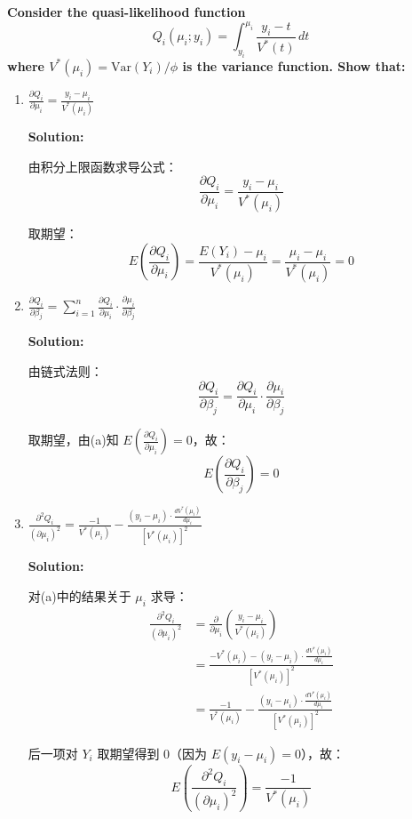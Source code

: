 \textbf{Consider the quasi-likelihood function}
\[
Q_i(\mu_i; y_i) = \int_{y_i}^{\mu_i} \frac{y_i - t}{V^*(t)} \, dt
\]
\textbf{where $V^*(\mu_i) = \text{Var}(Y_i) / \phi$ is the variance function. Show that:}

\begin{enumerate}
\item[(a)] $\frac{\partial Q_i}{\partial \mu_i} = \frac{y_i - \mu_i}{V^*(\mu_i)}$

\textbf{Solution:}

由积分上限函数求导公式：
\[
\frac{\partial Q_i}{\partial \mu_i} = \frac{y_i - \mu_i}{V^*(\mu_i)}
\]

取期望：
\[
E\left(\frac{\partial Q_i}{\partial \mu_i}\right) = \frac{E(Y_i) - \mu_i}{V^*(\mu_i)} = \frac{\mu_i - \mu_i}{V^*(\mu_i)} = 0
\]

\bigskip

\item[(b)] $\frac{\partial Q_i}{\partial \beta_j} = \sum_{i=1}^{n} \frac{\partial Q_i}{\partial \mu_i} \cdot \frac{\partial \mu_i}{\partial \beta_j}$

\textbf{Solution:}

由链式法则：
\[
\frac{\partial Q_i}{\partial \beta_j} = \frac{\partial Q_i}{\partial \mu_i} \cdot \frac{\partial \mu_i}{\partial \beta_j}
\]

取期望，由(a)知 $E\left(\frac{\partial Q_i}{\partial \mu_i}\right) = 0$，故：
\[
E\left(\frac{\partial Q_i}{\partial \beta_j}\right) = 0
\]

\bigskip

\item[(c)] $\frac{\partial^2 Q_i}{(\partial \mu_i)^2} = \frac{-1}{V^*(\mu_i)} - \frac{(y_i - \mu_i) \cdot \frac{dV^*(\mu_i)}{d\mu_i}}{[V^*(\mu_i)]^2}$

\textbf{Solution:}

对(a)中的结果关于 $\mu_i$ 求导：
\begin{align*}
\frac{\partial^2 Q_i}{(\partial \mu_i)^2} &= \frac{\partial}{\partial \mu_i}\left(\frac{y_i - \mu_i}{V^*(\mu_i)}\right) \\
&= \frac{-V^*(\mu_i) - (y_i - \mu_i) \cdot \frac{dV^*(\mu_i)}{d\mu_i}}{[V^*(\mu_i)]^2} \\
&= \frac{-1}{V^*(\mu_i)} - \frac{(y_i - \mu_i) \cdot \frac{dV^*(\mu_i)}{d\mu_i}}{[V^*(\mu_i)]^2}
\end{align*}

后一项对 $Y_i$ 取期望得到 0（因为 $E(y_i - \mu_i) = 0$），故：
\[
E\left(\frac{\partial^2 Q_i}{(\partial \mu_i)^2}\right) = \frac{-1}{V^*(\mu_i)}
\]


\end{enumerate}
